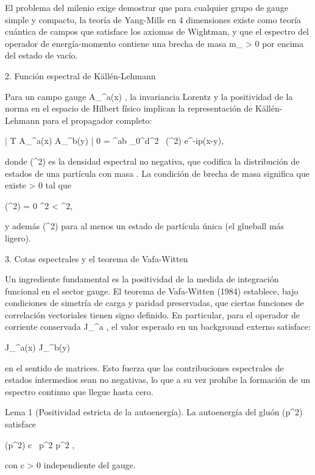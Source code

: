 \documentclass[12pt,a4paper]{book}
\begin{document}
El problema del milenio exige demostrar que para cualquier grupo de gauge simple y compacto, la teoría de Yang-Mills en 4 dimensiones existe como teoría cuántica de campos que satisface los axiomas de Wightman, y que el espectro del operador de energía-momento contiene una brecha de masa  m_{} > 0  por encima del estado de vacío.

2. Función espectral de Källén-Lehmann

Para un campo gauge  A_\mu^a(x) , la invariancia Lorentz y la positividad de la norma en el espacio de Hilbert físico implican la representación de Källén-Lehmann para el propagador completo:

 | T A_\mu^a(x) A_\nu^b(y) | 0 \rangle = \delta^{ab} \int_0^\infty d\mu^2 \, \rho(\mu^2) \int {}  e^{-ip\cdot(x-y)},
\]  

donde  \rho(\mu^2)   es la densidad espectral no negativa, que codifica la distribución de estados de una partícula con masa  \mu . La condición de brecha de masa significa que existe  \Delta > 0  tal que

\rho(\mu^2) = 0 \quad {}  \le \mu^2 < \Delta^2,
\]  

y además  \rho(\Delta^2)   para al menos un estado de partícula única (el glueball más ligero).

3. Cotas espectrales y el teorema de Vafa-Witten

Un ingrediente fundamental es la positividad de la medida de integración funcional en el sector gauge. El teorema de Vafa-Witten (1984) establece, bajo condiciones de simetría de carga y paridad preservadas, que ciertas funciones de correlación vectoriales tienen signo definido. En particular, para el operador de corriente conservada  J_\mu^a , el valor esperado en un background externo satisface:

\left\langle J_\mu^a(x) J_\nu^b(y) \right\rangle {}
\]  

en el sentido de matrices. Esto fuerza que las contribuciones espectrales de estados intermedios sean no negativas, lo que a su vez prohíbe la formación de un espectro continuo que llegue hasta cero.

Lema 1 (Positividad estricta de la autoenergía). La autoenergía del gluón  \Pi(p^2)  satisface

\Pi(p^2) \ge c \, p^2 \quad {} \quad p^2 ,
\]  

con  c > 0  independiente del gauge.
\end{document}
